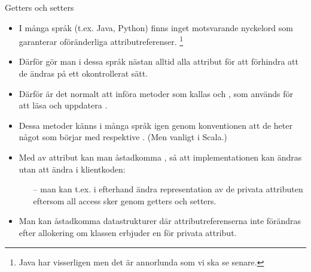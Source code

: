 \begin{Slide}{Getters och setters}\SlideFontSmall
\begin{itemize}
\item I många språk (t.ex. Java, Python) finns inget motsvarande nyckelord  som garanterar oföränderliga attributreferenser.
\footnote{Java har visserligen  men det är annorlunda som vi ska se senare.}

\item Därför gör man i dessa språk nästan alltid alla attribut  för att förhindra att de ändras på ett okontrollerat sätt.


\item Därför är det normalt att införa metoder som kallas  och , som används för att  läsa och uppdatera .

\item Dessa metoder känns i många språk igen genom konventionen att de heter något som börjar med  respektive . (Men  vanligt i Scala.)

\item Med  av attribut kan man åstadkomma , så att implementationen kan ändras utan att ändra i klientkoden:
\begin{itemize}\SlideFontSmall
\item[--] man kan t.ex. i efterhand ändra representation av de privata attributen eftersom all access sker genom getters och setters.
\end{itemize}

\item Man kan åstadkomma  datastrukturer där attributreferenserna inte förändras efter allokering om klassen  erbjuder en  för privata attribut.
\end{itemize}
\end{Slide}



